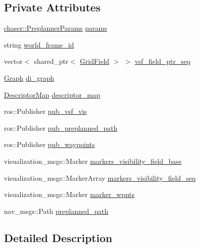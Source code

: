 \subsection*{Private Attributes}
\begin{DoxyCompactItemize}
\item 
\hyperlink{structchaser_1_1_preplanner_params}{chaser\+::\+Preplanner\+Params} \hyperlink{class_preplanner_a679cc4b70f041aff73769e7ec92dc5d0}{params}
\item 
string \hyperlink{class_preplanner_a08cb79c25bd4ded139a572672e4492cd}{world\+\_\+frame\+\_\+id}
\item 
vector$<$ shared\+\_\+ptr$<$ \hyperlink{struct_grid_field}{Grid\+Field} $>$ $>$ \hyperlink{class_preplanner_aab0f91e34b86eaa581c7642ba5059308}{vsf\+\_\+field\+\_\+ptr\+\_\+seq}
\item 
\hyperlink{_common_8h_a45f376d452c699e18013842e64602733}{Graph} \hyperlink{class_preplanner_af588e8495d5e78dd5a746f7c640daa4d}{di\+\_\+graph}
\item 
\hyperlink{_common_8h_a25b10a034823d9ab576650719f0d331c}{Descriptor\+Map} \hyperlink{class_preplanner_a45603cfb24429584c4fc8bc42474e1ff}{descriptor\+\_\+map}
\item 
ros\+::\+Publisher \hyperlink{class_preplanner_a8dafcd99dc50e89404c4f33a688eba6c}{pub\+\_\+vsf\+\_\+vis}
\item 
ros\+::\+Publisher \hyperlink{class_preplanner_a9655e452a9d0e228b8c2d8cdeac8ce6b}{pub\+\_\+preplanned\+\_\+path}
\item 
ros\+::\+Publisher \hyperlink{class_preplanner_a87dc12e474ee43c9e2b095ec64ab08ce}{pub\+\_\+waypoints}
\item 
visualization\+\_\+msgs\+::\+Marker \hyperlink{class_preplanner_a9c4d6a5e43241831b0ad11bdaf99ab16}{markers\+\_\+visibility\+\_\+field\+\_\+base}
\item 
visualization\+\_\+msgs\+::\+Marker\+Array \hyperlink{class_preplanner_abcee90044b5d5935168ed132e3dfc8a6}{markers\+\_\+visibility\+\_\+field\+\_\+seq}
\item 
visualization\+\_\+msgs\+::\+Marker \hyperlink{class_preplanner_adcc96f6ec12d7cb9980aa0c889b4ccd1}{marker\+\_\+wpnts}
\item 
nav\+\_\+msgs\+::\+Path \hyperlink{class_preplanner_ace035c98e9dc23739402d346976d567b}{preplanned\+\_\+path}
\end{DoxyCompactItemize}


\subsection{Detailed Description}


